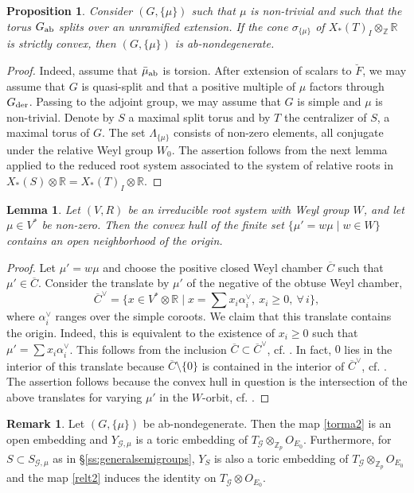 \documentclass[reqno, 10pt]{amsart}
\newcommand{\BR}{\ensuremath{\mathbb {R}}\xspace}
\newcommand{\BZ}{\ensuremath{\mathbb {Z}}\xspace}
\newcommand{\CG}{\ensuremath{\mathcal {G}}\xspace}
\newcommand{\ov}{\overline}
\newtheorem{proposition}[subsubsection]{Proposition}
\newtheorem{lemma}[subsubsection]{Lemma}
\theoremstyle{definition}
\newtheorem{remark}[subsubsection]{Remark}
\numberwithin{equation}{subsection}
\numberwithin{subsubsection}{subsection}
\newcommand{\br}{\breve}
\begin{document}
 \begin{proposition}\label{ab-stric} Consider $(G, \{\mu\})$ such that  $\mu$ is non-trivial and such that the torus $G_{\rm ab}$ splits over an unramified extension. If  the  cone $\sigma_{\{\mu\}}$ of $ X_*(T)_I\otimes_{\BZ}\BR$ is  strictly convex, then  $(G, \{\mu\})$ is ab-nondegenerate. 
 \end{proposition}
 \begin{proof}
   Indeed, assume that $\bar\mu_{\rm ab}$ is torsion. After extension of scalars to $\br F$, we may assume that $G$ is quasi-split and that a positive multiple of $\mu$ factors through $G_{\rm der}$. Passing to the adjoint group, we may assume that $G$ is simple and $\mu$ is non-trivial. Denote by $S$ a maximal split torus and by $T$ the centralizer of $S$, a maximal torus of $G$. The set $\Lambda_{\{\mu\}}$ consists of non-zero elements, all conjugate under the relative Weyl group $W_0$. The assertion follows from the next lemma applied to the reduced root system associated to the system of relative roots  in $X_*(S)\otimes\BR=X_*(T)_I\otimes\BR$.  
\end{proof}
\begin{lemma}\label{lim}
Let $(V, R)$ be an irreducible root system with Weyl group $W$, and let $\mu\in V^*$ be non-zero. Then the convex hull of the finite set $\{\mu'=w\mu\mid w\in W\}$ contains an open neighborhood of the origin. 
\end{lemma}
\begin{proof} Let $\mu'=w\mu$ and choose the positive closed Weyl chamber $\ov C$ such that $\mu'\in \ov C$. Consider the translate by $\mu'$ of the negative of the obtuse Weyl chamber, 
\[
\ov C^\vee=\{ x\in V^*\otimes \BR\mid x=\sum x_i\alpha_i^\vee, \ x_i\geq 0, \ \forall\, i\},
\]
where $\alpha_i^\vee$ ranges over the simple coroots.  We claim that this translate contains the origin. Indeed, this is equivalent to the existence of $x_i\geq 0$ such that $\mu'=\sum x_i\alpha_i^\vee$. This follows from the inclusion $\ov C\subset\ov C^\vee$, cf. \cite[ch. VI, \S 1.6, Prop. 18]{Bou}.  In fact, $0$ lies in the interior of this translate because $\ov C\setminus \{0\}$ is contained in the interior of $\ov C^\vee$, cf. \cite[Lem. 2.18]{Lim}. The assertion follows because the convex hull in question is the intersection of the above translates for varying $\mu'$ in the $W$-orbit, cf. \cite[Lem. 12.14]{AB}. 
\end{proof}

\begin{remark}
Let $(G, \{\mu\})$ be ab-nondegenerate.  Then  the map \eqref{torma2} is an open embedding and  $Y_{\CG, \mu}$ is a toric embedding of $T_\CG\otimes_{\BZ_p}O_{E_0}$. Furthermore, for $S\subset S_{\CG,\mu}$ as in \S \ref{ss:generalsemigroups}, $Y_S$ is also a toric embedding of $T_\CG\otimes_{\BZ_p}O_{E_0}$ and the map \eqref{relt2} induces the identity on $T_\CG\otimes O_{E_0}$.
\end{remark}
\end{document}
